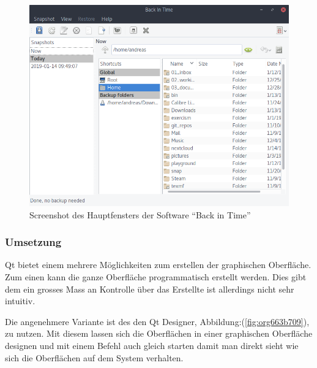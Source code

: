 \begin{figure}[htbp]
\centering
\includegraphics[width=.9\linewidth]{pictures/bit_main.png}
\caption{\label{fig:orgc56cec1}
Screenshot des Hauptfensters der Software "`Back in Time"'}
\end{figure}

\subsubsection{Umsetzung}
\label{sec:orgf72f50d}

Qt bietet einem mehrere Möglichkeiten zum erstellen der graphischen Oberfläche.
Zum einen kann die ganze Oberfläche programmatisch erstellt werden. Dies gibt
dem ein grosses Mass an Kontrolle über das Erstellte ist allerdings nicht sehr
intuitiv.

Die angenehmere Variante ist des den Qt Designer, Abbildung:(\ref{fig:org663b709}),
zu nutzen. Mit diesem lassen sich die Oberflächen in einer graphischen
Oberfläche designen und mit einem Befehl auch gleich starten damit man direkt
sieht wie sich die Oberflächen auf dem System verhalten.

